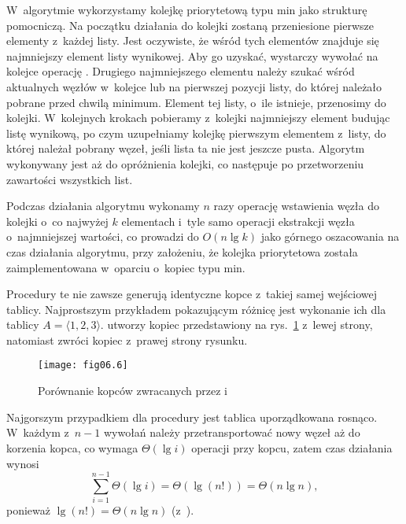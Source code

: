 \exercise %
W~algorytmie wykorzystamy kolejkę priorytetową typu min jako strukturę pomocniczą. Na początku działania do kolejki zostaną przeniesione pierwsze elementy z~każdej listy. Jest oczywiste, że wśród tych elementów znajduje się najmniejszy element listy wynikowej. Aby go uzyskać, wystarczy wywołać na kolejce operację . Drugiego najmniejszego elementu należy szukać wśród aktualnych węzłów w~kolejce lub na pierwszej pozycji listy, do której należało pobrane przed chwilą minimum. Element tej listy, o~ile istnieje, przenosimy do kolejki. W~kolejnych krokach pobieramy z~kolejki najmniejszy element budując listę wynikową, po czym uzupełniamy kolejkę pierwszym elementem z~listy, do której należał pobrany węzeł, jeśli lista ta nie jest jeszcze pusta. Algorytm wykonywany jest aż do opróżnienia kolejki, co następuje po przetworzeniu zawartości wszystkich list.

Podczas działania algorytmu wykonamy $n$ razy operację wstawienia węzła do kolejki o~co najwyżej $k$ elementach i~tyle samo operacji ekstrakcji węzła o~najmniejszej wartości, co prowadzi do $O(n\lg k)$ jako górnego oszacowania na czas działania algorytmu, przy założeniu, że kolejka priorytetowa została zaimplementowana w~oparciu o~kopiec typu min.

\problems


\subproblem %
Procedury te nie zawsze generują identyczne kopce z~takiej samej wejściowej tablicy. Najprostszym przykładem pokazującym różnicę jest wykonanie ich dla tablicy $A=\langle 1,2,3\rangle$.  utworzy kopiec przedstawiony na rys.~\ref{fig:6-1(a)} z~lewej strony, natomiast  zwróci kopiec z~prawej strony rysunku.
\begin{figure}[ht]
	\begin{center}
		\texttt{[image: fig06.6]}
	\end{center}
	\caption{Porównanie kopców zwracanych przez  i~} \label{fig:6-1(a)}
\end{figure}

\subproblem %
Najgorszym przypadkiem dla procedury  jest tablica uporządkowana rosnąco. W~każdym z~$n-1$ wywołań  należy przetransportować nowy węzeł aż do korzenia kopca, co wymaga $\Theta(\lg i)$ operacji przy  kopcu, zatem czas działania  wynosi
\[
	\sum_{i=1}^{n-1}\Theta(\lg i) = \Theta(\lg(n!)) = \Theta(n\lg n),
\]
ponieważ $\lg(n!)=\Theta(n\lg n)$ (z~).


